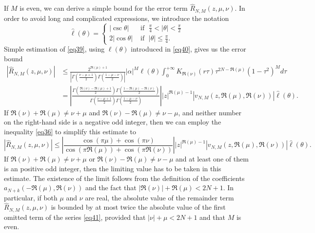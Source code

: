 \documentclass[a4paper,twoside,10pt]{amsart}
\numberwithin{equation}{section}
\begin{document}
If $M$ is even, we can derive a simple bound for the error term $\widehat R_{N,M} \left( {z,\mu ,\nu } \right)$. In order to avoid long and complicated expressions, we introduce the notation
\[
\widehat\ell \left( \theta  \right) = \begin{cases} \left|\csc \theta \right| & \text{ if } \; \frac{\pi}{4} < \left|\theta\right| <\frac{\pi}{2} \\ 2\left| {\cos\theta } \right| & \text{ if } \; \left|\theta\right| \leq \frac{\pi}{4} . \end{cases} 
\]
Simple estimation of \eqref{eq39}, using $\ell \left( \theta  \right)$ introduced in \eqref{eq40}, gives us the error bound
\begin{align*}
\left| {\widehat R_{N,M} \left( {z,\mu ,\nu } \right)} \right| & \le \frac{{2^{\Re\left(\mu\right)  + 1} }}{{\left| {\Gamma \left( {\frac{{\nu  - \mu  + 1}}{2}} \right)\Gamma \left( {\frac{{1 - \mu  - \nu }}{2}} \right)} \right|}}\left| \alpha  \right|^M \ell \left( \theta  \right)\int_0^{ + \infty } {K_{\Re \left( \nu  \right)} \left( {r\tau } \right)\tau ^{2N - \Re \left( \mu  \right)} \left( {1 - \tau ^2 } \right)^M d\tau } 
\\ & = \left| {\frac{{\Gamma \left( {\frac{{\Re \left( \nu  \right) - \Re \left( \mu  \right) + 1}}{2}} \right)\Gamma \left( {\frac{{1 - \Re \left( \mu  \right) - \Re \left( \nu  \right)}}{2}} \right)}}{{\Gamma \left( {\frac{{\nu  - \mu  + 1}}{2}} \right)\Gamma \left( {\frac{{1 - \mu  - \nu }}{2}} \right)}}} \right|\left| z \right|^{\Re \left( \mu  \right) - 1} \left| {v_{N,M} \left( {z,\Re \left( \mu  \right),\Re \left( \nu  \right)} \right)} \right|\widehat\ell \left( \theta  \right).
\end{align*}
If $\Re \left( \nu  \right) + \Re \left( \mu  \right) \neq \nu + \mu$ and $\Re \left( \nu  \right) - \Re \left( \mu  \right) \neq \nu - \mu$, and neither number on the right-hand side is a negative odd integer, then we can employ the inequality \eqref{eq36} to simplify this estimate to
\[
\left| {\widehat R_{N,M} \left( {z,\mu ,\nu } \right)} \right| \le \left| {\frac{{\cos \left( {\pi \mu } \right) + \cos \left( {\pi \nu } \right)}}{{\cos \left( {\pi \Re \left( \mu  \right)} \right) + \cos \left( {\pi \Re \left( \nu  \right)} \right)}}} \right|\left| z \right|^{\Re \left( \mu  \right) - 1} \left| {v_{N,M} \left( {z,\Re \left( \mu  \right),\Re \left( \nu  \right)} \right)} \right|\widehat\ell \left( \theta  \right).
\]
If $\Re \left( \nu  \right) + \Re \left( \mu  \right) \neq \nu + \mu$ or $\Re \left( \nu  \right) - \Re \left( \mu  \right) \neq \nu - \mu$ and at least one of them is an positive odd integer, then the limiting value has to be taken in this estimate. The existence of the limit follows from the definition of the coefficients $a_{N+k} \left( { - \Re \left( \mu  \right),\Re \left( \nu  \right)} \right)$ and the fact that $\left| {\Re \left( \nu  \right)} \right| + \Re \left( \mu  \right) < 2N + 1$. In particular, if  both $\mu$ and $\nu$ are real, the absolute value of the remainder term $\widehat R_{N,M} \left( {z,\mu ,\nu } \right)$ is bounded by at most twice the absolute value of the first omitted term of the series \eqref{eq41}, provided that $\left| \nu  \right| + \mu  < 2N + 1$ and that $M$ is even.
\end{document}
